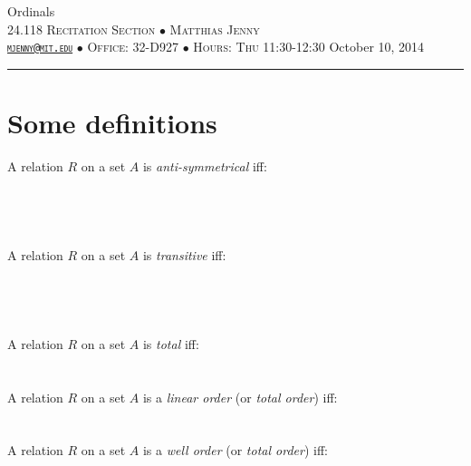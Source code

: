 \documentclass[justified]{tufte-handout}
\newcommand{\HRule}{\rule{\linewidth}{0.1mm}}
\begin{document}
\begin{fullwidth}
\noindent\LARGE Ordinals  \normalsize \\[.3cm]
\noindent  \textsc{24.118 Recitation Section $\bullet$ Matthias Jenny\\  {\texttt{\href{mailto:mjenny@mit.edu}{mjenny@mit.edu}}} $\bullet$ Office:  32-D927 $\bullet$ Hours: Thu 11:30-12:30} \hfill{October 10, 2014}
\noindent\HRule
\end{fullwidth}

\section{Some definitions}

\noindent A relation $R$ on a set $A$ is \emph{anti-symmetrical} iff: \underline{\hspace{9.95cm}}\\\\\underline{\hspace{16.88cm}}\\\\\underline{\hspace{16.88cm}}\\

\noindent A relation $R$ on a set $A$ is \emph{transitive} iff: \underline{\hspace{11cm}}\\\\\underline{\hspace{16.88cm}}\\\\\underline{\hspace{16.88cm}}\\

\noindent A relation $R$ on a set $A$ is \emph{total} iff: \underline{\hspace{11.7cm}}\\\\\underline{\hspace{16.88cm}}\\

\noindent A relation $R$ on a set $A$ is a \emph{linear order} (or \emph{total order}) iff: \underline{\hspace{8.3cm}}\\\\\underline{\hspace{16.88cm}}\\

\noindent A relation $R$ on a set $A$ is a \emph{well order} (or \emph{total order}) iff: \underline{\hspace{8.5cm}}\\\\\underline{\hspace{16.88cm}}\\
\end{document}
